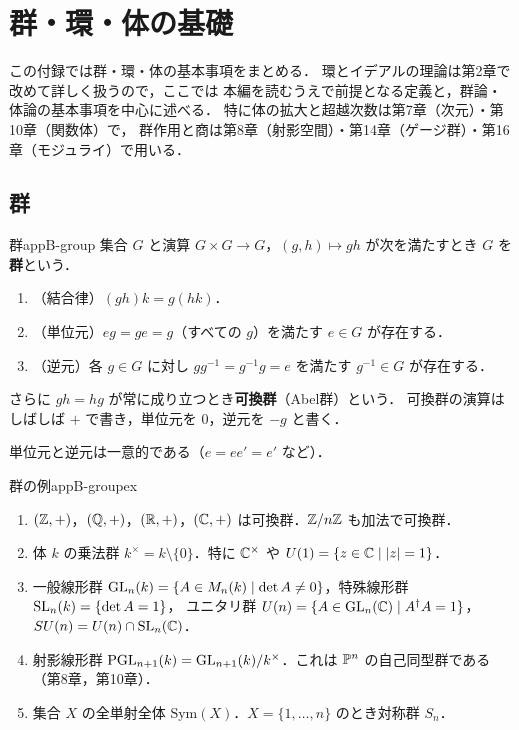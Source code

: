 \chapter{群・環・体の基礎}\label{app:B}

この付録では群・環・体の基本事項をまとめる．
環とイデアルの理論は第2章で改めて詳しく扱うので，ここでは
本編を読むうえで前提となる定義と，群論・体論の基本事項を中心に述べる．
特に体の拡大と超越次数は第7章（次元）・第10章（関数体）で，
群作用と商は第8章（射影空間）・第14章（ゲージ群）・第16章（モジュライ）で用いる．

\section{群}

\begin{mydef}{群}{appB-group}
集合 $G$ と演算 $G\times G\to G$，$(g,h)\mapsto gh$ が次を満たすとき $G$ を\textbf{群}という．
\begin{enumerate}
\item（結合律）$(gh)k=g(hk)$．
\item（単位元）$eg=ge=g$（すべての $g$）を満たす $e\in G$ が存在する．
\item（逆元）各 $g\in G$ に対し $gg^{-1}=g^{-1}g=e$ を満たす $g^{-1}\in G$ が存在する．
\end{enumerate}
さらに $gh=hg$ が常に成り立つとき\textbf{可換群}（Abel群）という．
可換群の演算はしばしば $+$ で書き，単位元を $0$，逆元を $-g$ と書く．
\end{mydef}

単位元と逆元は一意的である（$e=ee'=e'$ など）．

\begin{myex}{群の例}{appB-groupex}
\begin{enumerate}
\item $(\mathbb{Z},+)$，$(\mathbb{Q},+)$，$(\mathbb{R},+)$，$(\mathbb{C},+)$ は可換群．$\mathbb{Z}/n\mathbb{Z}$ も加法で可換群．
\item 体 $k$ の乗法群 $k^\times=k\setminus\{0\}$．特に $\mathbb{C}^\times$ や $U(1)=\{z\in\mathbb{C}\mid |z|=1\}$．
\item 一般線形群 $\operatorname{GL}_n(k)=\{A\in M_n(k)\mid\det A\ne0\}$，特殊線形群 $\operatorname{SL}_n(k)=\{\det A=1\}$，
ユニタリ群 $U(n)=\{A\in\operatorname{GL}_n(\mathbb{C})\mid A^\dagger A=1\}$，$SU(n)=U(n)\cap\operatorname{SL}_n(\mathbb{C})$．
\item 射影線形群 $\operatorname{PGL}_{n+1}(k)=\operatorname{GL}_{n+1}(k)/k^\times$．これは $\mathbb{P}^n$ の自己同型群である（第8章，第10章）．
\item 集合 $X$ の全単射全体 $\mathrm{Sym}(X)$．$X=\{1,\dots,n\}$ のとき対称群 $S_n$．
\end{enumerate}
\end{myex}

